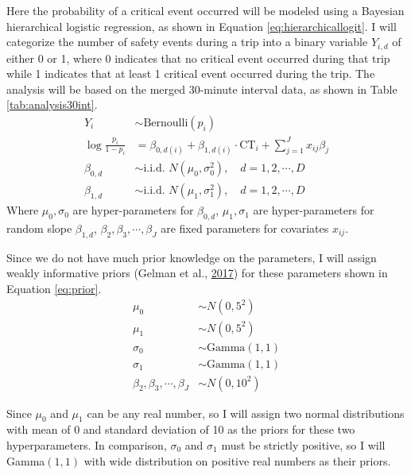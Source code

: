 \documentclass[12pt]{book}
\numberwithin{equation}{chapter}
\begin{document}
Here the probability of a critical event occurred will be modeled using a Bayesian hierarchical logistic regression, as shown in Equation \eqref{eq:hierarchicallogit}. I will categorize the number of safety events during a trip into a binary variable \(Y_{i, d}\) of either 0 or 1, where 0 indicates that no critical event occurred during that trip while 1 indicates that at least 1 critical event occurred during the trip. The analysis will be based on the merged 30-minute interval data, as shown in Table \ref{tab:analysis30int}.
\begin{equation}
\begin{split}
Y_{i} &\sim \text{Bernoulli}(p_{i})\\
\log\frac{p_{i}}{1-p_{i}} &= \beta_{0, d(i)} + \beta_{1, d(i)} \cdot \text{CT}_i + \sum_{j=1}^{J} x_{ij}\beta_j\\
\beta_{0, d} &\sim \text{i.i.d. } N(\mu_0, \sigma_0^2), \quad d = 1, 2, \cdots, D\\
\beta_{1, d} &\sim \text{i.i.d. } N(\mu_1, \sigma_1^2), \quad d = 1, 2, \cdots, D
\label{eq:hierarchicallogit}
\end{split}
\end{equation}
Where \(\mu_0, \sigma_0\) are hyper-parameters for \(\beta_{0, d}\), \(\mu_1, \sigma_1\) are hyper-parameters for random slope \(\beta_{1, d}\), \(\beta_2, \beta_3, \cdots, \beta_J\) are fixed parameters for covariates \(x_{ij}\).

Since we do not have much prior knowledge on the parameters, I will assign weakly informative priors (Gelman et al., \protect\hyperlink{ref-gelman2017prior}{2017}) for these parameters shown in Equation \eqref{eq:prior}.
\begin{equation}
\begin{split}
        \mu_0 & \sim N(0, 5^2)\\
        \mu_1 & \sim N(0, 5^2)\\
        \sigma_0 & \sim \text{Gamma}(1, 1)\\
        \sigma_1 & \sim \text{Gamma}(1, 1)\\
        \beta_2, \beta_3, \cdots, \beta_J  & \sim N(0, 10^2)
        \label{eq:prior}
\end{split}
\end{equation}

Since \(\mu_0\) and \(\mu_1\) can be any real number, so I will assign two normal distributions with mean of 0 and standard deviation of 10 as the priors for these two hyperparameters. In comparison, \(\sigma_0\) and \(\sigma_1\) must be strictly positive, so I will Gamma\((1, 1)\) with wide distribution on positive real numbers as their priors.
\end{document}
